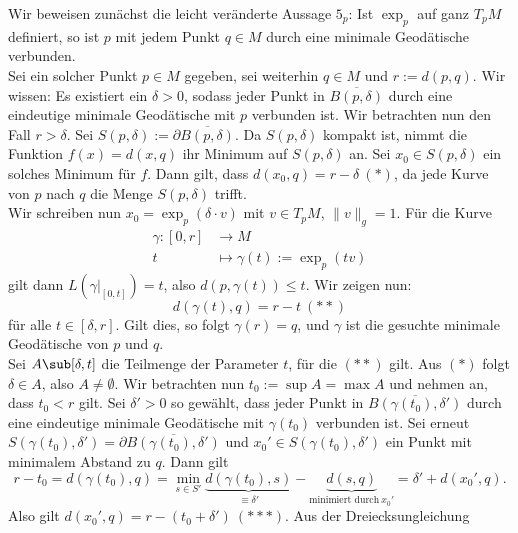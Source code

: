 \begin{beweis}
Wir beweisen zunächst die leicht veränderte Aussage $5_p$: Ist $\exp_p$ auf ganz $T_pM$ definiert, so ist $p$ mit jedem Punkt $q \in M$ durch eine minimale Geodätische verbunden.\\
Sei ein solcher Punkt $p \in M$ gegeben, sei weiterhin $q \in  M$ und $r := d(p,q)$. Wir wissen: Es existiert ein $\delta > 0$, sodass jeder Punkt in $\overline{B(p,\delta)}$ durch eine eindeutige minimale Geodätische mit $p$ verbunden ist. Wir betrachten nun den Fall $r > \delta$. Sei $S(p, \delta) := \partial \overline{B(p,\delta)}$. Da $S(p, \delta)$ kompakt ist, nimmt die Funktion $f(x)=d(x,q)$ ihr Minimum auf $S(p,\delta)$ an. Sei $x_0 \in S(p, \delta)$ ein solches Minimum für $f$. Dann gilt, dass $d(x_0,q)=r-\delta \ (\ast)$, da jede Kurve von $p$ nach $q$ die Menge $S(p,\delta)$ trifft.\\
Wir schreiben nun $x_0 = \exp_p(\delta \cdot v)$ mit $v \in T_pM$, $\| v \|_g = 1$. Für die Kurve
\begin{align}
\gamma: [0,r] &\to M\\
t &\mapsto \gamma(t):=\exp_p(tv)
\end{align}
gilt dann $L(\gamma|_{[0,t]}) = t$, also $d(p, \gamma(t)) \leq t$. Wir zeigen nun: 
\begin{equation}
d(\gamma(t), q) = r - t \ (\ast \ast)
\end{equation}
für alle $t \in [\delta, r]$. Gilt dies, so folgt $\gamma(r)=q$, und $\gamma$ ist die gesuchte minimale Geodätische von $p$ und $q$.\\
Sei $A \sub [\delta, t]$ die Teilmenge der Parameter $t$, für die $(\ast \ast)$ gilt. Aus $(\ast)$ folgt $\delta \in A$, also $A \neq \emptyset$. Wir betrachten nun $t_0 := \sup A = \max A$ und nehmen an, dass $t_0 < r$ gilt. Sei $\delta' > 0$ so gewählt, dass jeder Punkt in $\overline{B(\gamma(t_0), \delta')}$ durch eine eindeutige minimale Geodätische mit $\gamma(t_0)$ verbunden ist. Sei erneut $S(\gamma(t_0), \delta')= \partial \overline{B(\gamma(t_0), \delta')}$ und $x_0' \in S(\gamma(t_0), \delta')$ ein Punkt mit minimalem Abstand zu $q$. Dann gilt
\begin{equation}
r - t_0 = d(\gamma(t_0),q) = \min_{s \in S'} \underbrace{d(\gamma(t_0), s)}_{\equiv \delta'} - \underbrace{d(s,q)}_{\text{minimiert durch} \ x_0'} = \delta' + d(x_0', q).
\end{equation}
Also gilt $d(x_0', q) = r - (t_0 + \delta') \ (\ast \ast \ast)$. Aus der Dreiecksungleichung
\begin{equation}

\end{equation}
\end{beweis}
